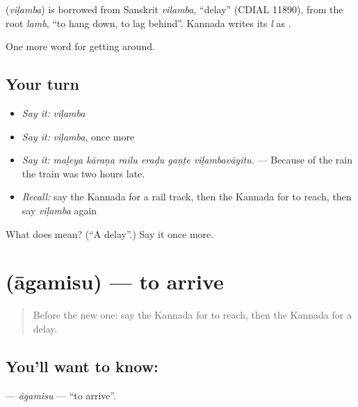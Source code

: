 \begin{cousinweb}
\textbf{} (\emph{viḷamba}) is borrowed from Sanskrit \emph{vilamba}, \textquotedblleft{}delay\textquotedblright{} (CDIAL 11890), from the root \emph{lamb}, \textquotedblleft{}to hang down, to lag behind\textquotedblright{}. Kannada writes its \emph{l} as .
\end{cousinweb}

\begin{grammarlens}[title={What you've built}]
One more word for getting around.
\end{grammarlens}

\subsection*{Your turn}
\begin{itemize}
\raggedright
  \item \emph{Say it:} \emph{viḷamba}
  \item \emph{Say it:} \emph{viḷamba}, once more
  \item \emph{Say it:} \emph{maḷeya kāraṇa railu eraḍu gaṇṭe viḷambavāyitu.} — Because of the rain the train was two hours late.
  \item \emph{Recall:} say the Kannada for a rail track, then the Kannada for to reach, then say \emph{viḷamba} again
\end{itemize}

\begin{tcolorbox}[breakable,colback=teal!4,colframe=teal!35!black,title={Before you move on}]
What does  mean? (\textquotedblleft{}A delay\textquotedblright{}.) Say it once more.
\end{tcolorbox}
\section[\texorpdfstring{\kn{ಆಗಮಿಸು} (āgamisu)}{ಆಗಮಿಸು (āgamisu)}]{ (āgamisu) — to arrive}

\label{lesson:KA-C434-agamisu}



\begin{quote}
Before the new one: say the Kannada for to reach, then the Kannada for a delay.
\end{quote}

\subsection*{You'll want to know: }
\textbf{} — \emph{āgamisu} — \textquotedblleft{}to arrive\textquotedblright{}.

